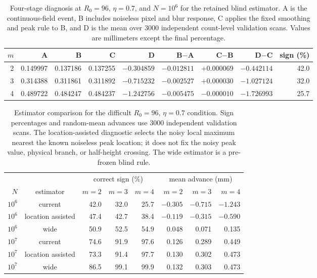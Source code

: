\begin{table}[htbp]
\centering\scriptsize
\caption{Four-stage diagnosis at $R_0=96$, $\eta=0.7$, and $N=10^6$ for the retained blind estimator. A is the continuous-field event, B includes noiseless pixel and blur response, C applies the fixed smoothing and peak rule to B, and D is the mean over 3000 independent count-level validation scans. Values are millimeters except the final percentage.}
\label{tab:measurement-stages}
\begin{tabular}{r@{\quad}rrrrrrrr}
\toprule
$m$ & A & B & C & D & B$-$A & C$-$B & D$-$C & sign (\%) \\
\midrule
2 & 0.149997 & 0.137186 & 0.137255 & $-0.304859$ & $-0.012811$ & $+0.000069$ & $-0.442114$ & 42.0 \\
3 & 0.314388 & 0.311861 & 0.311892 & $-0.715232$ & $-0.002527$ & $+0.000030$ & $-1.027124$ & 32.0 \\
4 & 0.489722 & 0.484247 & 0.484237 & $-1.242756$ & $-0.005475$ & $-0.000010$ & $-1.726993$ & 25.7 \\
\bottomrule
\end{tabular}
\end{table}

\begin{table}[htbp]
\centering\scriptsize
\caption{Estimator comparison for the difficult $R_0=96$, $\eta=0.7$ condition. Sign percentages and random-mean advances use 3000 independent validation scans. The location-assisted diagnostic selects the noisy local maximum nearest the known noiseless peak location; it does not fix the noisy peak value, physical branch, or half-height crossing. The wide estimator is a pre-frozen blind rule.}
\label{tab:measurement-estimators}
\begin{tabular}{rcrrr@{\qquad}rrr}
\toprule
& & \multicolumn{3}{c}{correct sign (\%)} & \multicolumn{3}{c}{mean advance (mm)}\\
$N$ & estimator & $m=2$ & $m=3$ & $m=4$ & $m=2$ & $m=3$ & $m=4$ \\
\midrule
$10^{6}$ & current & 42.0 & 32.0 & 25.7 & $-0.305$ & $-0.715$ & $-1.243$ \\
$10^{6}$ & location assisted & 47.4 & 42.7 & 38.4 & $-0.119$ & $-0.315$ & $-0.590$ \\
$10^{6}$ & wide & 50.9 & 52.5 & 54.9 & 0.048 & 0.071 & 0.135 \\
$10^{7}$ & current & 74.6 & 91.9 & 97.6 & 0.126 & 0.289 & 0.449 \\
$10^{7}$ & location assisted & 73.3 & 91.4 & 97.7 & 0.130 & 0.302 & 0.473 \\
$10^{7}$ & wide & 86.5 & 99.1 & 99.9 & 0.132 & 0.303 & 0.473 \\
\bottomrule
\end{tabular}
\end{table}
